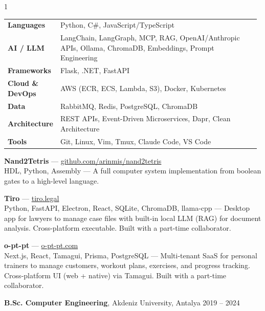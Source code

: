 \documentclass[11pt,a4paper]{altacv}
\begin{document}
\begin{paracol}{1}
{\small\vspace{2pt}
\begin{tabular}{p{0.18\linewidth} p{0.8\linewidth}}
\textbf{Languages}      & Python, C\#, JavaScript/TypeScript \\
\textbf{AI / LLM}       & LangChain, LangGraph, MCP, RAG, OpenAI/Anthropic APIs, Ollama, ChromaDB, Embeddings, Prompt Engineering \\
\textbf{Frameworks}    & Flask, .NET, FastAPI \\
\textbf{Cloud \& DevOps} & AWS (ECR, ECS, Lambda, S3), Docker, Kubernetes \\
\textbf{Data}          & RabbitMQ, Redis, PostgreSQL, ChromaDB \\
\textbf{Architecture}   & REST APIs, Event-Driven Microservices, Dapr, Clean Architecture \\
\textbf{Tools}          & Git, Linux, Vim, Tmux, Claude Code, VS Code \\
\end{tabular}\smallskip
}

\textbf{Nand2Tetris} — \href{https://github.com/arinmis/nand2tetris}{github.com/arinmis/nand2tetris} \\
HDL, Python, Assembly — A full computer system implementation from boolean gates to a high-level language.

\textbf{Tiro} — \href{https://tiro.legal}{tiro.legal} \\
Python, FastAPI, Electron, React, SQLite, ChromaDB, llama-cpp — Desktop app for lawyers to manage case files with built-in local LLM (RAG) for document analysis. Cross-platform executable. Built with a part-time collaborator.

\textbf{o-pt-pt} — \href{https://o-pt-pt.com}{o-pt-pt.com} \\
Next.js, React, Tamagui, Prisma, PostgreSQL — Multi-tenant SaaS for personal trainers to manage customers, workout plans, exercises, and progress tracking. Cross-platform UI (web + native) via Tamagui. Built with a part-time collaborator.

\textbf{B.Sc. Computer Engineering}, Akdeniz University, Antalya \hfill 2019 -- 2024

\end{paracol}
\end{document}
